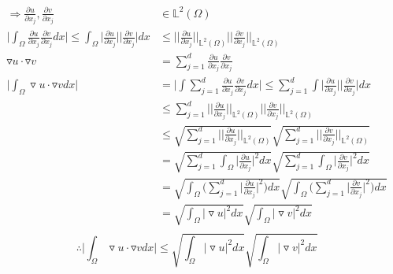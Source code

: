 \documentclass[a4paper,12pt]{article}
\newcommand{\Lspace}{\mathbb{L}}
\begin{document}
\begin{equation}\nonumber
\begin{aligned}
\Rightarrow \frac{\partial u}{\partial x_j}, \frac{\partial v}{\partial x_j} & \in {\Lspace^2(\Omega)}\\
\bigg| \int_\Omega \frac{\partial u}{\partial x_j} \frac{\partial v}{\partial x_j}dx\bigg| \leq \int_\Omega \bigg| \frac{\partial u}{\partial x_j} \bigg| \bigg| \frac{\partial v}{\partial x_j} \bigg| dx & \leq \bigg|\bigg| \frac{\partial u}{\partial x_j}\bigg|\bigg|_{\Lspace^2(\Omega)} \bigg|\bigg| \frac{\partial v}{\partial x_j} \bigg|\bigg|_{\Lspace^2(\Omega)}\\
\triangledown u \cdot \triangledown v &= \sum_{j=1}^{d}\frac{\partial u}{\partial x_j} \frac{\partial v}{\partial x_j}\\
\bigg| \int_{\Omega} \triangledown u \cdot \triangledown v dx \bigg| &= \bigg| \int \sum_{j=1}^{d}\frac{\partial u}{\partial x_j} \frac{\partial v}{\partial x_j} dx \bigg| \leq  \sum_{j=1}^{d} \int \bigg| \frac{\partial u}{\partial x_j} \bigg| \bigg|  \frac{\partial v}{\partial x_j} \bigg| dx\\
&\leq \sum_{j=1}^{d} \bigg|\bigg| \frac{\partial u}{\partial x_j} \bigg|\bigg|_{\Lspace^2(\Omega)} \bigg|\bigg| \frac{\partial v}{\partial x_j} \bigg|\bigg|_{\Lspace^2(\Omega)}\\
&\leq \sqrt{\sum_{j=1}^{d} \bigg|\bigg| \frac{\partial u}{\partial x_j} \bigg|\bigg|_{\Lspace^2(\Omega)}} \sqrt{\sum_{j=1}^{d} \bigg|\bigg| \frac{\partial v}{\partial x_j} \bigg|\bigg|_{\Lspace^2(\Omega)}}\\
&= \sqrt{\sum_{j=1}^{d}\int_\Omega\bigg|\frac{\partial u}{\partial x_j}\bigg|^2 dx} \sqrt{\sum_{j=1}^{d}\int_\Omega\bigg|\frac{\partial v}{\partial x_j}\bigg|^2 dx}\\
&= \sqrt{\int_\Omega\bigg(\sum_{j=1}^{d}\bigg|\frac{\partial u}{\partial x_j}\bigg|^2\bigg) dx} \sqrt{\int_\Omega\bigg(\sum_{j=1}^{d}\bigg|\frac{\partial v}{\partial x_j}\bigg|^2\bigg) dx}\\
&= \sqrt{\int_\Omega\big| \triangledown u \big|^2 dx} \sqrt{\int_\Omega\big| \triangledown v \big|^2 dx}\\
\end{aligned}
\end{equation}
\begin{equation}
\therefore \bigg| \int_{\Omega} \triangledown u \cdot \triangledown v dx \bigg| \leq \sqrt{\int_\Omega\big| \triangledown u \big|^2 dx} \sqrt{\int_\Omega\big| \triangledown v \big|^2 dx}
\end{equation}
\end{document}
